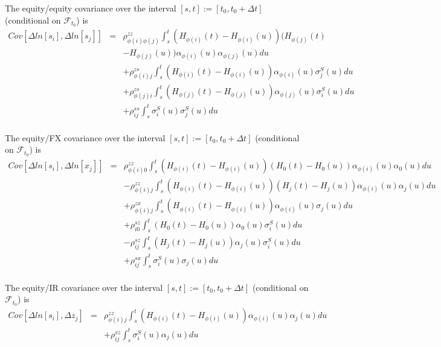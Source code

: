 \documentclass[12pt, a4paper]{article}
\begin{document}
\begin{appendix}
The equity/equity covariance over the interval $[s,t] := [t_0, t_0+\Delta t]$ (conditional on $\mathcal{F}_{t_0}$) is
\begin{eqnarray*}
	Cov \left[\Delta ln[s_i], \Delta ln[s_j] \right] &=&
	\rho_{\phi(i) \phi(j)}^{zz}\int_s^t (H_{\phi(i)} (t) - H_{\phi(i)} (u)) (H_{\phi(j)} (t)\\
	&& - H_{\phi(j)} (u)) \alpha_{\phi(i)}(u) \alpha_{\phi(j)}(u) du\\
	&&+ \rho_{\phi(i) j}^{zs} \int_s^t (H_{\phi(i)} (t) - H_{\phi(i)} (u)) \alpha_{\phi(i)}(u) \sigma_j^S(u) du\\
	&&+ \rho_{\phi(j) i}^{zs} \int_s^t (H_{\phi(j)} (t) - H_{\phi(j)} (u)) \alpha_{\phi(j)}(u) \sigma_i^S(u) du\\
	&&+ \rho_{ij}^{ss} \int_s^t \sigma_i^S(u) \sigma_j^S(u) du\\
\end{eqnarray*}

The equity/FX covariance over the interval $[s,t] := [t_0, t_0+\Delta t]$ (conditional on $\mathcal{F}_{t_0}$) is
\begin{eqnarray*}
	Cov \left[\Delta ln[s_i], \Delta ln[x_j] \right] &=&
	\rho_{\phi(i)0}^{zz} \int_s^t (H_{\phi(i)} (t) - H_{\phi(i)} (u)) (H_0 (t) - H_0 (u)) \alpha_{\phi(i)}(u) 
	\alpha_0(u) 
	du\\
	&& - \rho_{\phi(i)j}^{zz} \int_s^t (H_{\phi(i)} (t) - H_{\phi(i)} (u)) (H_j (t) - H_j (u)) \alpha_{\phi(i)} 
	(u)\alpha_j(u) du\\
	&& + \rho_{\phi(i)j}^{zx} \int_s^t (H_{\phi(i)} (t) - H_{\phi(i)} (u)) \alpha_{\phi(i)} (u) \sigma_j(u) du\\
	&&+ \rho_{i0}^{sz} \int_s^t (H_0 (t) - H_0 (u)) \alpha_0 (u) \sigma_i^S(u) du\\
	&&- \rho_{ij}^{sz} \int_s^t (H_j (t) - H_j (u)) \alpha_j (u) \sigma_i^S(u) du\\
	&&+ \rho_{ij}^{sx} \int_s^t \sigma_i^S(u) \sigma_j(u) du\\
\end{eqnarray*}

The equity/IR covariance over the interval $[s,t] := [t_0, t_0+\Delta t]$ (conditional on $\mathcal{F}_{t_0}$) is
\begin{eqnarray*}
	Cov \left[\Delta ln[s_i], \Delta z_j \right] &=&
	\rho_{\phi(i)j}^{zz} \int_s^t (H_{\phi(i)} (t) - H_{\phi(i)} (u)) \alpha_{\phi(i)} (u) \alpha_j (u) du\\
	&&+ \rho_{ij}^{sz} \int_s^t \sigma_i^S (u) \alpha_j (u) du\\
\end{eqnarray*}


\end{appendix}
\end{document}
